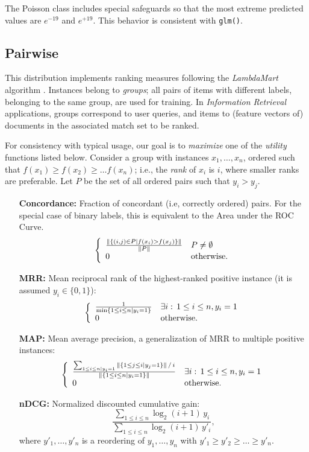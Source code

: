 \documentclass{article}
\begin{document}
The Poisson class includes special safeguards so that the most extreme predicted values are $e^{-19}$ and $e^{+19}$. This behavior is consistent with \texttt{glm()}.


\subsection{Pairwise}

This distribution implements ranking measures following the
\emph{LambdaMart} algorithm \cite{Burges:2010}. Instances belong to
\emph{groups}; all pairs of items with different labels, belonging to
the same group, are used for training. In \emph{Information Retrieval}
applications, groups correspond to user queries,
and items to (feature vectors of) documents in the associated match
set to be ranked.

For consistency with typical usage, our goal is to \emph{maximize} one
of the \emph{utility} functions listed below. Consider a group with
instances $x_1, \dots, x_n$, ordered such that $f(x_1) \geq f(x_2)
\geq \dots f(x_n)$; i.e., the \emph{rank} of $x_i$ is $i$, where
smaller ranks are preferable. Let $P$ be the set of all ordered pairs
such that $y_i > y_j$.

\begin{enumerate}
\item[{\bf Concordance:}] Fraction of concordant (i.e, correctly ordered)
  pairs. For the special case of binary labels, this is equivalent to
  the Area under the ROC Curve.
$$\left\{ \begin{array}{l l}\frac{\|\{(i,j)\in P |
      f(x_i)>f(x_j)\}\|}{\|P\|}
    & P \neq \emptyset\\
    0 & \mbox{otherwise.}
    \end{array}\right.
$$
\item[{\bf MRR:}] Mean reciprocal rank of the highest-ranked positive
  instance (it is assumed $y_i\in\{0,1\}$):
$$\left\{ \begin{array}{l l}\frac{1}{\min\{1 \leq i \leq n |y_i=1\}}
    & \exists i: \, 1 \leq i \leq n, y_i=1\\
    0 & \mbox{otherwise.}\end{array}\right.$$
\item[{\bf MAP:}] Mean average precision, a generalization of
  MRR to multiple positive instances:
$$\left\{ \begin{array}{l l} \frac{\sum_{1\leq i\leq n | y_i=1} \|\{1\leq j\leq i
    |y_j=1\}\|\,/\,i}{\|\{1\leq i\leq n | y_i=1\}\|}  & \exists i: \,
    1 \leq i \leq n, y_i=1\\ 
    0 & \mbox{otherwise.}\end{array}\right.$$
\item[{\bf nDCG:}] Normalized discounted cumulative gain:
$$\frac{\sum_{1\leq i\leq n} \log_2(i+1) \, y_i}{\sum_{1\leq i\leq n}
  \log_2(i+1) \, y'_i},$$ where $y'_1, \dots, y'_n$ is a reordering of $y_1,
  \dots,y_n$ with $y'_1 \geq y'_2 \geq \dots \geq y'_n$.
\end{enumerate}
\end{document}
